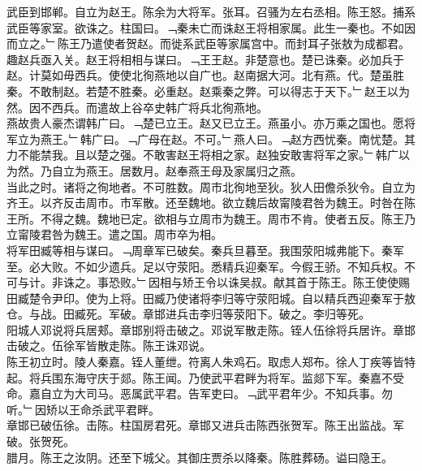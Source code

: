 \documentclass{zhvt-classic}
\begin{document}
\hspace*{2em}武臣到邯郸。自立为赵王。陈余为大将军。张耳。召骚为左右丞相。陈王怒。捕系武臣等家室。欲诛之。柱国曰。﹁秦未亡而诛赵王将相家属。此生一秦也。不如因而立之。﹂陈王乃遣使者贺赵。而徙系武臣等家属宫中。而封耳子张敖为成都君。趣赵兵亟入关。赵王将相相与谋曰。﹁王王赵。非楚意也。楚已诛秦。必加兵于赵。计莫如毋西兵。使使北徇燕地以自广也。赵南据大河。北有燕。代。楚虽胜秦。不敢制赵。若楚不胜秦。必重赵。赵乘秦之弊。可以得志于天下。﹂赵王以为然。因不西兵。而遣故上谷卒史韩广将兵北徇燕地。\\
\hspace*{2em}燕故贵人豪杰谓韩广曰。﹁楚已立王。赵又已立王。燕虽小。亦万乘之国也。愿将军立为燕王。﹂韩广曰。﹁广母在赵。不可。﹂燕人曰。﹁赵方西忧秦。南忧楚。其力不能禁我。且以楚之强。不敢害赵王将相之家。赵独安敢害将军之家。﹂韩广以为然。乃自立为燕王。居数月。赵奉燕王母及家属归之燕。\\
\hspace*{2em}当此之时。诸将之徇地者。不可胜数。周市北徇地至狄。狄人田儋杀狄令。自立为齐王。以齐反击周市。市军散。还至魏地。欲立魏后故甯陵君咎为魏王。时咎在陈王所。不得之魏。魏地已定。欲相与立周市为魏王。周市不肯。使者五反。陈王乃立甯陵君咎为魏王。遣之国。周市卒为相。\\
\hspace*{2em}将军田臧等相与谋曰。﹁周章军已破矣。秦兵旦暮至。我围荥阳城弗能下。秦军至。必大败。不如少遗兵。足以守荥阳。悉精兵迎秦军。今假王骄。不知兵权。不可与计。非诛之。事恐败。﹂因相与矫王令以诛吴叔。献其首于陈王。陈王使使赐田臧楚令尹印。使为上将。田臧乃使诸将李归等守荥阳城。自以精兵西迎秦军于敖仓。与战。田臧死。军破。章邯进兵击李归等荥阳下。破之。李归等死。\\
\hspace*{2em}阳城人邓说将兵居郏。章邯别将击破之。邓说军散走陈。铚人伍徐将兵居许。章邯击破之。伍徐军皆散走陈。陈王诛邓说。\\
\hspace*{2em}陈王初立时。陵人秦嘉。铚人董绁。符离人朱鸡石。取虑人郑布。徐人丁疾等皆特起。将兵围东海守庆于郯。陈王闻。乃使武平君畔为将军。监郯下军。秦嘉不受命。嘉自立为大司马。恶属武平君。告军吏曰。﹁武平君年少。不知兵事。勿听。﹂因矫以王命杀武平君畔。\\
\hspace*{2em}章邯已破伍徐。击陈。柱国房君死。章邯又进兵击陈西张贺军。陈王出监战。军破。张贺死。\\
\hspace*{2em}腊月。陈王之汝阴。还至下城父。其御庄贾杀以降秦。陈胜葬砀。谥曰隐王。\\
\end{document}
